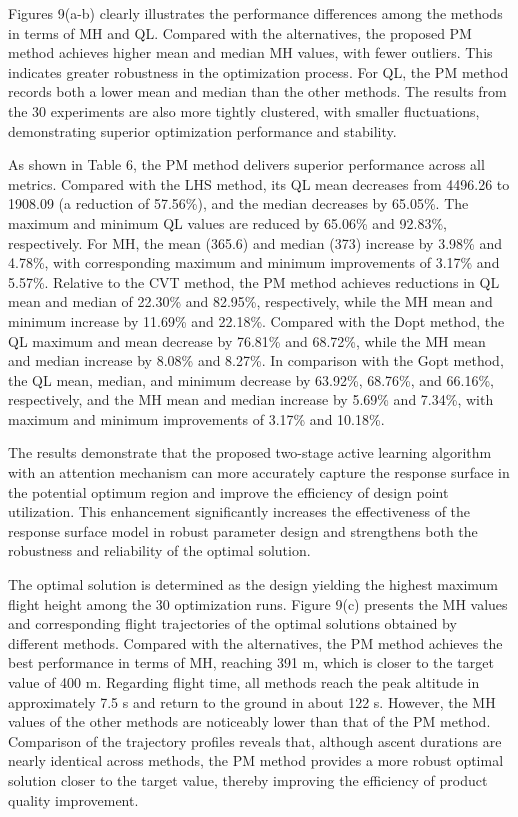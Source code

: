 \documentclass[]{interact}
\theoremstyle{plain}%
\theoremstyle{definition}
\theoremstyle{remark}
\begin{document}
Figures 9(a-b) clearly illustrates the performance differences among the methods in terms of MH and QL. Compared with the alternatives, the proposed PM method achieves higher mean and median MH values, with fewer outliers. This indicates greater robustness in the optimization process. For QL, the PM method records both a lower mean and median than the other methods. The results from the 30 experiments are also more tightly clustered, with smaller fluctuations, demonstrating superior optimization performance and stability.

As shown in Table 6, the PM method delivers superior performance across all metrics. Compared with the LHS method, its QL mean decreases from 4496.26 to 1908.09 (a reduction of 57.56\%), and the median decreases by 65.05\%. The maximum and minimum QL values are reduced by 65.06\% and 92.83\%, respectively. For MH, the mean (365.6) and median (373) increase by 3.98\% and 4.78\%, with corresponding maximum and minimum improvements of 3.17\% and 5.57\%. Relative to the CVT method, the PM method achieves reductions in QL mean and median of 22.30\% and 82.95\%, respectively, while the MH mean and minimum increase by 11.69\% and 22.18\%. Compared with the D\-opt method, the QL maximum and mean decrease by 76.81\% and 68.72\%, while the MH mean and median increase by 8.08\% and 8.27\%. In comparison with the G\-opt method, the QL mean, median, and minimum decrease by 63.92\%, 68.76\%, and 66.16\%, respectively, and the MH mean and median increase by 5.69\% and 7.34\%, with maximum and minimum improvements of 3.17\% and 10.18\%.

The results demonstrate that the proposed two-stage active learning algorithm with an attention mechanism can more accurately capture the response surface in the potential optimum region and improve the efficiency of design point utilization. This enhancement significantly increases the effectiveness of the response surface model in robust parameter design and strengthens both the robustness and reliability of the optimal solution.

The optimal solution is determined as the design yielding the highest maximum flight height among the 30 optimization runs. Figure 9(c) presents the MH values and corresponding flight trajectories of the optimal solutions obtained by different methods. Compared with the alternatives, the PM method achieves the best performance in terms of MH, reaching 391 m, which is closer to the target value of 400 m. Regarding flight time, all methods reach the peak altitude in approximately 7.5 s and return to the ground in about 122 s. However, the MH values of the other methods are noticeably lower than that of the PM method. Comparison of the trajectory profiles reveals that, although ascent durations are nearly identical across methods, the PM method provides a more robust optimal solution closer to the target value, thereby improving the efficiency of product quality improvement.
\end{document}
